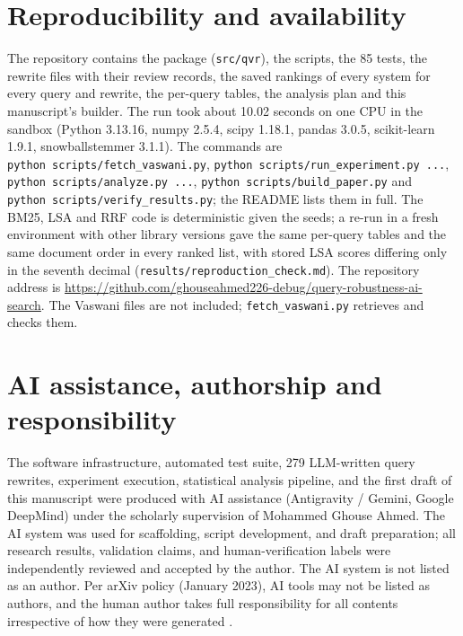 \documentclass[
  11pt,
]{article}
\begin{document}
\hypertarget{reproducibility-and-availability}{%
\section{Reproducibility and
availability}\label{reproducibility-and-availability}}

The repository contains the package (\texttt{src/qvr}), the scripts, the
85 tests, the rewrite files with their review records, the saved
rankings of every system for every query and rewrite, the per-query
tables, the analysis plan and this manuscript's builder. The run took
about 10.02 seconds on one CPU in the sandbox (Python 3.13.16, numpy
2.5.4, scipy 1.18.1, pandas 3.0.5, scikit-learn 1.9.1, snowballstemmer
3.1.1). The commands are \texttt{python\ scripts/fetch\_vaswani.py},
\texttt{python\ scripts/run\_experiment.py\ ...},
\texttt{python\ scripts/analyze.py\ ...},
\texttt{python\ scripts/build\_paper.py} and
\texttt{python\ scripts/verify\_results.py}; the README lists them in
full. The BM25, LSA and RRF code is deterministic given the seeds; a
re-run in a fresh environment with other library versions gave the same
per-query tables and the same document order in every ranked list, with
stored LSA scores differing only in the seventh decimal
(\texttt{results/reproduction\_check.md}). The repository address is
{\url{https://github.com/ghouseahmed226-debug/query-robustness-ai-search}}. The Vaswani files
are not included; \texttt{fetch\_vaswani.py} retrieves and checks them.

\hypertarget{ai-assistance-authorship-and-responsibility}{%
\section{AI assistance, authorship and
responsibility}\label{ai-assistance-authorship-and-responsibility}}

The software infrastructure, automated test suite, 279 LLM-written query rewrites, experiment execution, statistical analysis pipeline, and the first draft of this manuscript were produced with AI assistance (Antigravity / Gemini, Google DeepMind) under the scholarly supervision of Mohammed Ghouse Ahmed. The AI system was used for scaffolding, script development, and draft preparation; all research results, validation claims, and human-verification labels were independently reviewed and accepted by the author. The AI system is not listed as an author. Per arXiv policy (January 2023), AI tools may not be listed as authors, and the human author takes full responsibility for all contents irrespective of how they were generated \citep{arxiv_ai_policy}.
\end{document}
